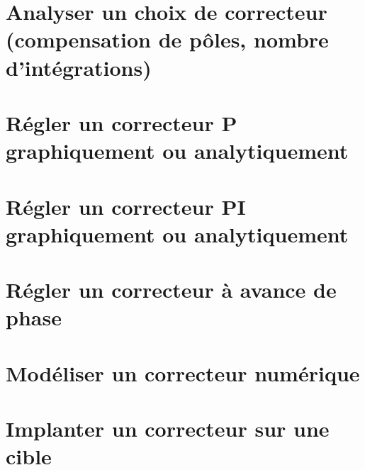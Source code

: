 \section{Analyser un choix de correcteur (compensation de pôles, nombre d'intégrations)} 
\clearpage 
\newpage 
\section{Régler un correcteur P graphiquement ou analytiquement} 
\graphicspath{{\repStyle/png/}{../COR/COR-02-P/65_Eclipse/images/}} 
 
 
\clearpage 
\newpage 
\section{Régler un correcteur PI graphiquement ou analytiquement} 
\graphicspath{{\repStyle/png/}{../COR/COR-03-PI/65_Eclipse_02/images/}} 
 
 
\graphicspath{{\repStyle/png/}{../COR/COR-03-PI/66_Micromanipulateur/images/}} 
 
 
\graphicspath{{\repStyle/png/}{../COR/COR-03-PI/67_PompeTurbo/images/}} 
 
 
\graphicspath{{\repStyle/png/}{../COR/COR-03-PI/68_Roburoc/images/}} 
 
 
\graphicspath{{\repStyle/png/}{../COR/COR-03-PI/70_Hublex/images/}} 
 
 
\clearpage 
\newpage 
\section{Régler un correcteur à avance de phase} 
\graphicspath{{\repStyle/png/}{../COR/COR-04-AP/65_Eclipse_03/images/}} 
 
 
\clearpage 
\newpage 
\section{Modéliser un correcteur numérique} 
\clearpage 
\newpage 
\section{Implanter un correcteur sur une cible} 
\clearpage 
\newpage 
\setchapterpreamble[u]{\margintoc} 
